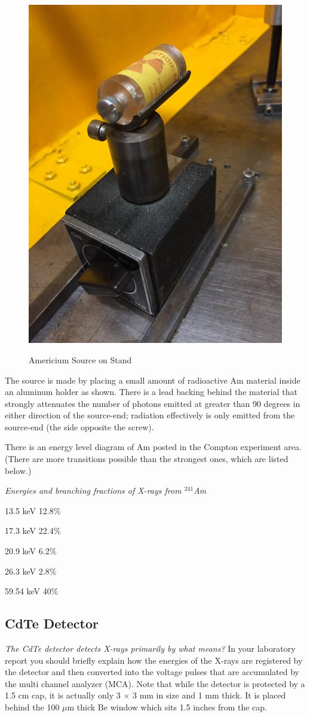 \documentclass{../lab}
\begin{document}
\begin{figure}[h]
    \centering
    \href{http://experimentationlab.berkeley.edu/sites/default/files/images/COMSource.JPG}{\includegraphics[width=0.37\linewidth]{images/COMSource.JPG}}
    \caption{Americium Source on Stand}
    \label{COMSource}
\end{figure}

The source is made by placing a small amount of radioactive Am material inside an aluminum holder as shown. There is a lead backing behind the material that strongly attenuates the number of photons emitted at greater than 90 degrees in either direction of the source-end; radiation effectively is only emitted from the source-end (the side opposite the screw).

There is an energy level diagram of Am posted in the Compton experiment area. (There are more transitions possible than the strongest ones, which are listed below.)

\emph{Energies and branching fractions of X-rays from $^{241}$Am}

13.5 keV 12.8\%

17.3 keV 22.4\%

20.9 keV 6.2\%

26.3 keV 2.8\%

59.54 keV 40\%

\subsection{CdTe Detector}

\emph{The CdTe detector detects X-rays primarily by what means?} In your laboratory report you should briefly explain how the energies of the X-rays are registered by the detector and then converted into the voltage pulses that are accumulated by the multi channel analyzer (MCA). Note that while the detector is protected by a 1.5 cm cap, it is actually only 3 $\times$ 3 mm in size and 1 mm thick. It is placed behind the 100 $\mu$m thick Be window which sits 1.5 inches from the cap.
\end{document}
